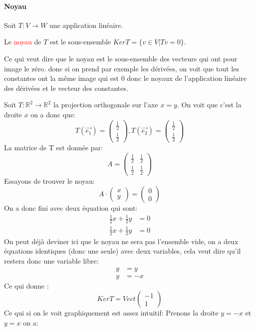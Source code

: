 \paragraph{Noyau}
Soit $T: V \to W$ une application linéaire.
\begin{definition}
    Le \textcolor{red}{noyau} de $T$ est le sous-ensemble $Ker T = \{v \in V | Tv = 0\}$.
\end{definition}
Ce qui veut dire que le noyau est le sous-ensemble des vecteurs qui ont pour image le zéro. donc si on prend par exemple les dérivées, on voit que tout les constantes ont la même image qui est 0 donc le noyaux de l'application linéaire des dérivées et le vecteur des constantes.
\begin{exemple}
    Soit $T: \mathbb{R}^2 \to \mathbb{R}^2$ la projection orthogonale sur l'axe $x = y$.
    On voit que c'est la droite $x$ on a donc que:
    \[T(\vec{e_1}) = \begin{pmatrix}
        \frac{1}{2}\\ \frac{1}{2}
    \end{pmatrix}, T(\vec{e_2}) = \begin{pmatrix}
        \frac{1}{2}\\ \frac{1}{2}
    \end{pmatrix}\]
La matrice de T est donnée par:
\[A = \begin{pmatrix}
    \frac{1}{2} & \frac{1}{2} \\
    \frac{1}{2} & \frac{1}{2}
\end{pmatrix}\]
Essayons de trouver le noyau:
\[A\cdot\begin{pmatrix}
    x \\ y
\end{pmatrix} = \begin{pmatrix}
    0 \\ 0
\end{pmatrix}\]
    On a donc fini avec deux équation qui sont:
    \begin{align*}
        \frac{1}{2}x + \frac{1}{2}y  &= 0\\
        \frac{1}{2}x + \frac{1}{2}y &= 0
    \end{align*}
    On peut déjà deviner ici que le noyau ne sera pas l'ensemble vide, on a deux équations identiques (donc une seule) avec deux variables, cela veut dire qu'il restera donc une variable libre:
    \begin{align*}
        y &= y \\
        y &= -x
    \end{align*}
    Ce qui donne : 
    \[Ker T = Vect\begin{pmatrix}
        -1 \\ 1
    \end{pmatrix}\]
    Ce qui si on le voit graphiquement est assez intuitif:
    Prenons la droite $y = -x$ et $y = x$ on a:
\begin{center}
    


\end{center}
\end{exemple}
